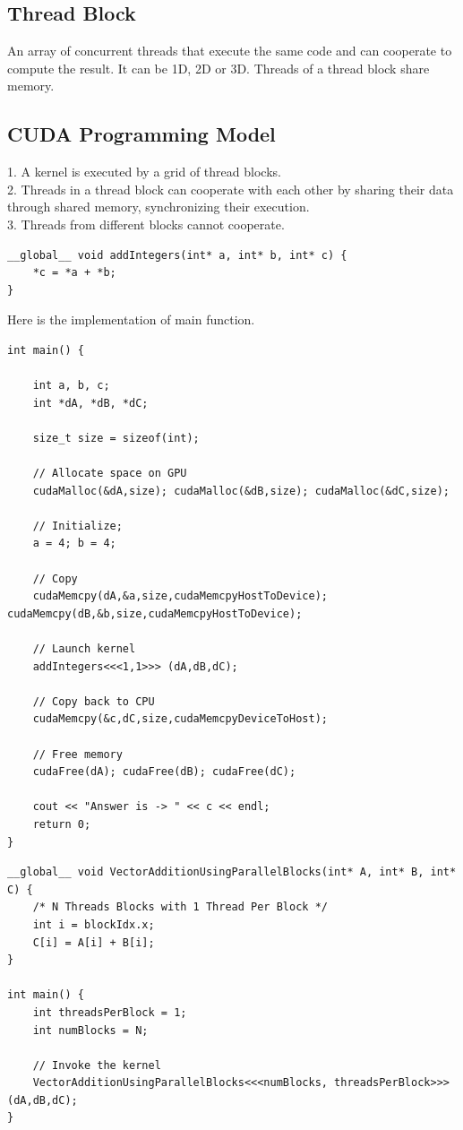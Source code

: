 \documentclass{article}
\begin{document}
\subsection*{Thread Block}
An array of concurrent threads that execute the same code and can cooperate to compute the result. It can be 1D, 2D or 3D. Threads of a thread block share memory.

\subsection*{CUDA Programming Model}
1. A kernel is executed by a grid of thread blocks. \\
2. Threads in a thread block can cooperate with each other by sharing their data through shared memory, synchronizing their execution. \\
3. Threads from different blocks cannot cooperate. \\

\begin{lstlisting}
__global__ void addIntegers(int* a, int* b, int* c) {
    *c = *a + *b;
}
\end{lstlisting}

Here is the implementation of main function.  
\begin{lstlisting}
int main() {
    
    int a, b, c;
    int *dA, *dB, *dC;

    size_t size = sizeof(int);

    // Allocate space on GPU
    cudaMalloc(&dA,size); cudaMalloc(&dB,size); cudaMalloc(&dC,size);

    // Initialize;
    a = 4; b = 4;

    // Copy
    cudaMemcpy(dA,&a,size,cudaMemcpyHostToDevice); cudaMemcpy(dB,&b,size,cudaMemcpyHostToDevice);

    // Launch kernel
    addIntegers<<<1,1>>> (dA,dB,dC);

    // Copy back to CPU
    cudaMemcpy(&c,dC,size,cudaMemcpyDeviceToHost);

    // Free memory
    cudaFree(dA); cudaFree(dB); cudaFree(dC);

    cout << "Answer is -> " << c << endl;
    return 0;
}
\end{lstlisting}

\newpage

\begin{lstlisting}
__global__ void VectorAdditionUsingParallelBlocks(int* A, int* B, int* C) {
    /* N Threads Blocks with 1 Thread Per Block */
    int i = blockIdx.x;
    C[i] = A[i] + B[i];
}

int main() {
    int threadsPerBlock = 1;
    int numBlocks = N;

    // Invoke the kernel
    VectorAdditionUsingParallelBlocks<<<numBlocks, threadsPerBlock>>> (dA,dB,dC);
}
\end{lstlisting}
\end{document}
